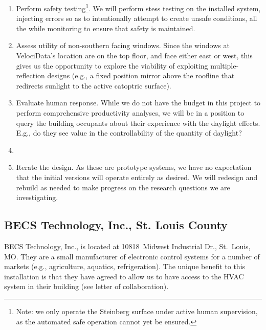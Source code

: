 \begin{enumerate}

\item Perform safety testing\footnote{Note: we only operate the Steinberg
surface under active human
supervision, as the automated safe operation cannot yet be ensured.}.
We will perform stess testing on the installed system, injecting errors so as to
intentionally attempt to create unsafe conditions, all the while monitoring
to ensure that safety is maintained.

\item Assess utility of non-southern facing windows.
Since the windows at VelociData's location are on the top floor, and face
either east or west, this gives us the opportunity to explore the viability
of exploiting multiple-reflection designs
(e.g., a fixed position mirror above the
roofline that redirects sunlight to the active catoptric surface).

\item Evaluate human response.
While we do not have the budget in this project to perform
comprehensive productivity analyses, we will be in a position to
query the building occupants about their experience with the
daylight effects. E.g., do they see value in the controllability
of the quantity of daylight?

\item {}

\item Iterate the design.
As these are prototype systems, we have no expectation that the
initial versions will operate entirely as desired.  We will redesign
and rebuild as needed to make progress on the research questions we
are investigating.

\end{enumerate}

\subsection{BECS Technology, Inc., St. Louis County}

BECS Technology, Inc., is located at
10818~Midwest Industrial Dr., St.~Louis, MO.
They are a small manufacturer of electronic control
systems for a number of markets (e.g., agriculture, aquatics, refrigeration).
The unique benefit to this installation is that they have agreed to
allow us to have access to the HVAC system in their building (see letter
of collaboration).


